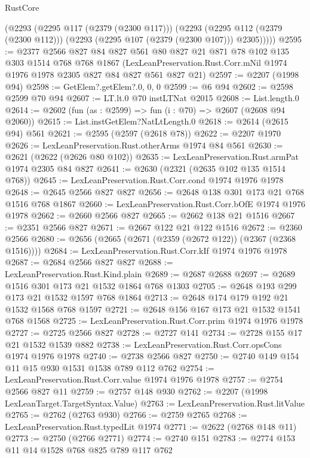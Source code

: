 \begin{lexlean}{RustCore}
\begin{coremodule}
        (@2293
          (@2295 @117 (@2379 (@2300 @117)))
          (@2293
            (@2295 @112 (@2379 (@2300 @112)))
            (@2293 (@2295 @107 (@2379 (@2300 @107))) @2305)))))
@2595 := @2377
    @2566
    @827
    @84
    @827
    @561
    @80
    @827
    @21
    @871
    @78
    @102
    @135
    @303
    @1514
    @768
    @768
    @1867
    (LexLeanPreservation.Rust.Corr.mNil @1974 @1976 @1978 @2305 @827 @84 @827 @561 @827 @21)
@2597 := @2207 (@1998 @94)
@2598 := GetElem?.getElem?.{0, 0, 0}
@2599 := @6 @94
@2602 := @2598 @2599 @70 @94
@2607 := LT.lt.{0} @70 instLTNat @2015
@2608 := List.length.{0}
@2614 := @2602 (fun (as : @2599) => fun (i : @70) => @2607 (@2608 @94 @2060))
@2615 := List.instGetElem?NatLtLength.{0}
@2618 := @2614 (@2615 @94) @561
@2621 := @2595 (@2597 (@2618 @78))
@2622 := @2207 @1970
@2626 := LexLeanPreservation.Rust.otherArms @1974 @84 @561
@2630 := @2621 (@2622 (@2626 @80 @102))
@2635 := LexLeanPreservation.Rust.armPat @1974 @2305 @84 @827
@2641 := @2630 (@2321 (@2635 @102 @135 @1514 @768))
@2645 := LexLeanPreservation.Rust.Corr.cond @1974 @1976 @1978
@2648 := @2645 @2566 @827 @827
@2656 := @2648 @138 @301 @173 @21 @768 @1516 @768 @1867
@2660 := LexLeanPreservation.Rust.Corr.bOfE @1974 @1976 @1978
@2662 := @2660 @2566 @827
@2665 := @2662 @138 @21 @1516
@2667 := @2351 @2566 @827
@2671 := @2667 @122 @21 @122 @1516
@2672 := @2360 @2566
@2680 := @2656 (@2665 (@2671 (@2359 (@2672 @122)) (@2367 (@2368 @1516))))
@2684 := LexLeanPreservation.Rust.Corr.kIf @1974 @1976 @1978
@2687 := @2684 @2566 @827 @827
@2688 := LexLeanPreservation.Rust.Kind.plain
@2689 := @2687 @2688
@2697 := @2689 @1516 @301 @173 @21 @1532 @1864 @768 @1303
@2705 := @2648 @193 @299 @173 @21 @1532 @1597 @768 @1864
@2713 := @2648 @174 @179 @192 @21 @1532 @1568 @768 @1597
@2721 := @2648 @156 @167 @173 @21 @1532 @1541 @768 @1568
@2725 := LexLeanPreservation.Rust.Corr.prim @1974 @1976 @1978
@2727 := @2725 @2566 @827
@2728 := @2727 @141
@2734 := @2728 @155 @17 @21 @1532 @1539 @882
@2738 := LexLeanPreservation.Rust.Corr.opsCons @1974 @1976 @1978
@2740 := @2738 @2566 @827
@2750 := @2740 @149 @154 @11 @15 @930 @1531 @1538 @789 @112 @762
@2754 := LexLeanPreservation.Rust.Corr.value @1974 @1976 @1978
@2757 := @2754 @2566 @827 @11
@2759 := @2757 @148 @930
@2762 := @2207 (@1998 LexLeanTarget.TargetSyntax.Value)
@2763 := LexLeanPreservation.Rust.litValue
@2765 := @2762 (@2763 @930)
@2766 := @2759 @2765
@2768 := LexLeanPreservation.Rust.typedLit @1974
@2771 := @2622 (@2768 @148 @11)
@2773 := @2750 (@2766 @2771)
@2774 := @2740 @151
@2783 := @2774 @153 @11 @14 @1528 @768 @825 @789 @117 @762

\end{coremodule}
\end{lexlean}

